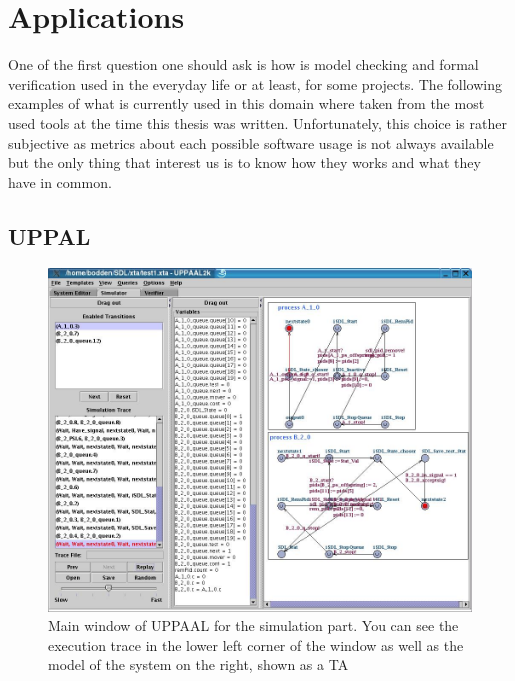 \documentclass[12pt]{article}
\theoremstyle{definition}
\theoremstyle{definition}
\theoremstyle{remark}
\begin{document}
\section{Applications}


One of the first question one should ask is how is model checking and formal verification used in the everyday life or at least, for some projects. The following examples of what is currently used in this domain where taken from the most used tools at the time this thesis was written. Unfortunately, this choice is rather subjective as metrics about each possible software usage is not always available but the only thing that interest us is to know how they works and what they have in common.


\subsection{UPPAL}

\begin{figure}
    \centering
    \includegraphics[scale=0.3]{UPPAAL_trace.jpg}
    \caption{Main window of UPPAAL for the simulation part. You can see the execution trace in the lower left corner of the window as well as the model of the system on the right, shown as a TA}
    \label{UPPAAL}
\end{figure}
\end{document}
